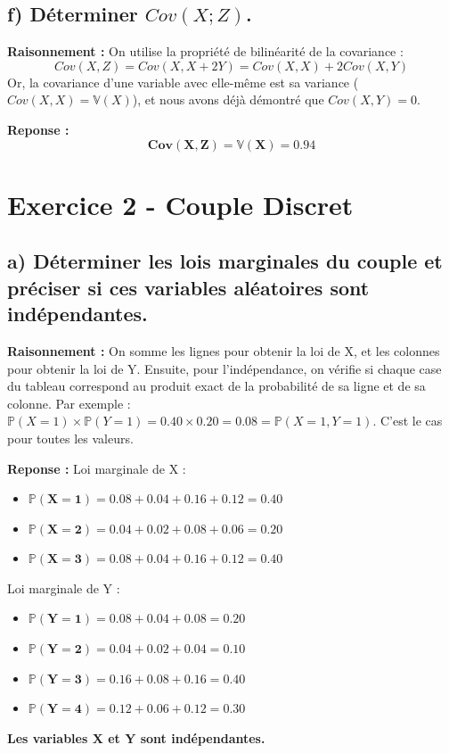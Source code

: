 \documentclass[11pt,a4paper]{article}
\begin{document}
\subsection*{f) Déterminer $Cov(X;Z)$.}

\textbf{Raisonnement :} 
On utilise la propriété de bilinéarité de la covariance :
$$ Cov(X, Z) = Cov(X, X+2Y) = Cov(X,X) + 2Cov(X,Y) $$
Or, la covariance d'une variable avec elle-même est sa variance ($Cov(X,X) = \mathbb{V}(X)$), et nous avons déjà démontré que $Cov(X,Y) = 0$.

\textbf{Reponse :}
$$ \mathbf{Cov(X, Z) = \mathbb{V}(X) = 0.94} $$

\hrulefill

\section*{Exercice 2 - Couple Discret}

\subsection*{a) Déterminer les lois marginales du couple et préciser si ces variables aléatoires sont indépendantes.}

\textbf{Raisonnement :} 
On somme les lignes pour obtenir la loi de X, et les colonnes pour obtenir la loi de Y.
Ensuite, pour l'indépendance, on vérifie si chaque case du tableau correspond au produit exact de la probabilité de sa ligne et de sa colonne.
Par exemple : $\mathbb{P}(X=1) \times \mathbb{P}(Y=1) = 0.40 \times 0.20 = 0.08 = \mathbb{P}(X=1,Y=1)$. C'est le cas pour toutes les valeurs.

\textbf{Reponse :}
Loi marginale de X :
\begin{itemize}
    \item $\mathbf{\mathbb{P}(X=1)} = 0.08 + 0.04 + 0.16 + 0.12 = \mathbf{0.40}$
    \item $\mathbf{\mathbb{P}(X=2)} = 0.04 + 0.02 + 0.08 + 0.06 = \mathbf{0.20}$
    \item $\mathbf{\mathbb{P}(X=3)} = 0.08 + 0.04 + 0.16 + 0.12 = \mathbf{0.40}$
\end{itemize}
Loi marginale de Y :
\begin{itemize}
    \item $\mathbf{\mathbb{P}(Y=1)} = 0.08 + 0.04 + 0.08 = \mathbf{0.20}$
    \item $\mathbf{\mathbb{P}(Y=2)} = 0.04 + 0.02 + 0.04 = \mathbf{0.10}$
    \item $\mathbf{\mathbb{P}(Y=3)} = 0.16 + 0.08 + 0.16 = \mathbf{0.40}$
    \item $\mathbf{\mathbb{P}(Y=4)} = 0.12 + 0.06 + 0.12 = \mathbf{0.30}$
\end{itemize}
\textbf{Les variables X et Y sont indépendantes.}
\end{document}
